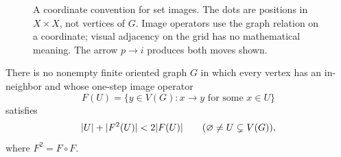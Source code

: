 \begin{figure}[ht]\centering
\caption{A coordinate convention for set images. The dots are positions in $X\times X$, not vertices of $G$. Image operators use the graph relation on a coordinate; visual adjacency on the grid has no mathematical meaning. The arrow $p\to i$ produces both moves shown.}
\end{figure}
\begin{proposition}\label{prop:no-concavity}
There is no nonempty finite oriented graph $G$ in which every vertex has an
in-neighbor and whose one-step image operator
\[
 F(U)=\{y\in V(G):x\to y\text{ for some }x\in U\}
\]
satisfies
\begin{equation}\label{eq:impossible-concavity}
 \lvert U\rvert+\lvert F^2(U)\rvert<2\lvert F(U)\rvert
 \qquad(\varnothing\ne U\subsetneq V(G)),
\end{equation}
where $F^2=F\circ F$.
\end{proposition}

